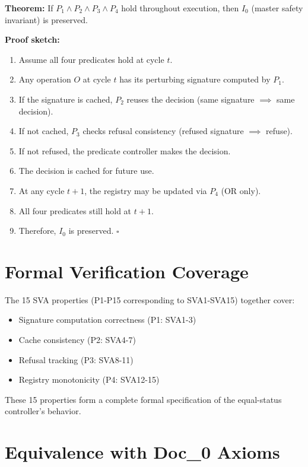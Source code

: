 \documentclass[11pt,oneside]{article}
\begin{document}
\begin{boxed}
\textbf{Theorem:} If $P_1 \land P_2 \land P_3 \land P_4$ hold throughout execution, then $I_0$ (master safety invariant) is preserved.

\textbf{Proof sketch:}
\begin{enumerate}
\item Assume all four predicates hold at cycle $t$.
\item Any operation $O$ at cycle $t$ has its perturbing signature computed by $P_1$.
\item If the signature is cached, $P_2$ reuses the decision (same signature $\implies$ same decision).
\item If not cached, $P_3$ checks refusal consistency (refused signature $\implies$ refuse).
\item If not refused, the predicate controller makes the decision.
\item The decision is cached for future use.
\item At any cycle $t+1$, the registry may be updated via $P_4$ (OR only).
\item All four predicates still hold at $t+1$.
\item Therefore, $I_0$ is preserved. $\square$
\end{enumerate}
\end{boxed}

\section{Formal Verification Coverage}

The 15 SVA properties (P1-P15 corresponding to SVA1-SVA15) together cover:

\begin{itemize}
\item Signature computation correctness (P1: SVA1-3)
\item Cache consistency (P2: SVA4-7)
\item Refusal tracking (P3: SVA8-11)
\item Registry monotonicity (P4: SVA12-15)
\end{itemize}

These 15 properties form a complete formal specification of the equal-status controller's behavior.

\section{Equivalence with Doc\_0 Axioms}
\end{document}
